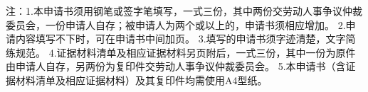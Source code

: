\documentclass[zihao=-4]{ctexart}
\begin{document}

\begin{linote}
注：1.本申请书须用钢笔或签字笔填写，一式三份，其中两份交劳动人事争议仲裁委员会，一份申请人自存；被申请人为两个或以上的，申请书须相应增加。\newline
\hspace*{2\ccwd}2.申请内容填写不下时，可在申请书中间加页。\newline
\hspace*{2\ccwd}3.填写的申请书须字迹清楚，文字简练规范。\newline
\hspace*{2\ccwd}4.证据材料清单及相应证据材料另页附后，一式三份，其中一份为原件由申请人自存，另两份为复印件交劳动人事争议仲裁委员会。\newline
\hspace*{2\ccwd}5.本申请书（含证据材料清单及相应证据材料）及其复印件均需使用A4型纸。
\end{linote}
\end{document}
